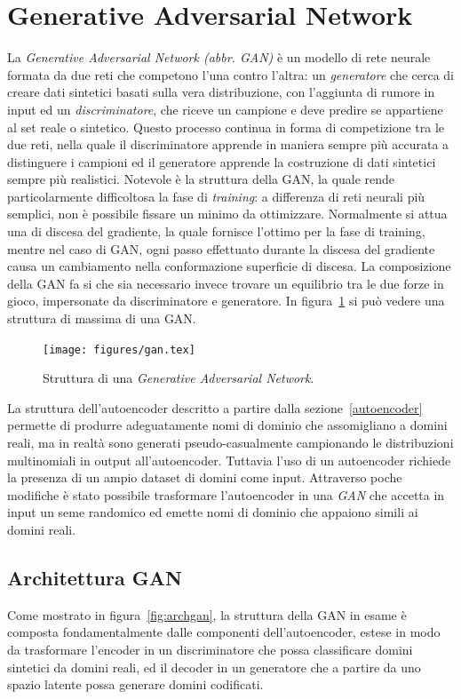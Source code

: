 \newpage
\section{Generative Adversarial Network}
\label{ganintro}
La \textit{Generative Adversarial Network (abbr. GAN)} è un modello di rete neurale formata da due reti che competono l'una contro l'altra: un \textit{generatore} che cerca di creare dati sintetici basati sulla vera distribuzione, con l'aggiunta di rumore in input ed un \textit{discriminatore}, che riceve un campione e deve predire se appartiene al set reale o sintetico. Questo processo continua in forma di competizione tra le due reti, nella quale il discriminatore apprende in maniera sempre più accurata a distinguere i campioni ed il generatore apprende la costruzione di dati sintetici sempre più realistici. Notevole è la struttura della GAN, la quale rende particolarmente difficoltosa la fase di \textit{training}: a differenza di reti neurali più semplici, non è possibile fissare un minimo da ottimizzare. Normalmente si attua una di discesa del gradiente, la quale fornisce l'ottimo per la fase di training, mentre nel caso di GAN, ogni passo effettuato durante la discesa del gradiente causa un cambiamento nella conformazione superficie di discesa. La composizione della GAN fa si che sia necessario invece trovare un equilibrio tra le due forze in gioco, impersonate da discriminatore e generatore. In figura~\ref{fig:gan} si può vedere una struttura di massima di una GAN.

\begin{figure}[!bp]
    \centering
	\texttt{[image: figures/gan.tex]}
	\caption{Struttura di una \textit{Generative Adversarial Network}.
\label{fig:gan}}
\end{figure}


La struttura dell'autoencoder descritto a partire dalla sezione~\ref{autoencoder} permette di produrre adeguatamente nomi di dominio che assomigliano a domini reali, ma in realtà sono generati pseudo-casualmente campionando le distribuzioni multinomiali in output all'autoencoder. Tuttavia l'uso di un autoencoder richiede la presenza di un ampio dataset di domini come input. Attraverso poche modifiche è stato possibile trasformare l'autoencoder in una \textit{GAN} che accetta in input un seme randomico ed emette nomi di dominio che appaiono simili ai domini reali.

\subsection{Architettura GAN}
\label{ganarch}
Come mostrato in figura~\ref{fig:archgan}, la struttura della GAN in esame è composta fondamentalmente dalle componenti dell'autoencoder, estese in modo da trasformare l'encoder in un discriminatore che possa classificare domini sintetici da domini reali, ed il decoder in un generatore che a partire da uno spazio latente possa generare domini codificati.

